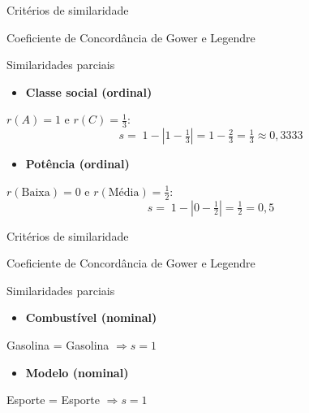 \documentclass[
  ignorenonframetext,
  aspectratio=169,
]{beamer}
\providecommand{\tightlist}{%
  \setlength{\itemsep}{0pt}\setlength{\parskip}{0pt}}
\begin{document}
\begin{frame}{Critérios de similaridade}
\label{crituxe9rios-de-similaridade-17}
\begin{block}{Coeficiente de Concordância de Gower e Legendre}
\label{coeficiente-de-concorduxe2ncia-de-gower-e-legendre-10}
\begin{block}{Similaridades parciais}
\label{similaridades-parciais-1}
\begin{itemize}
\tightlist
\item
  \textbf{Classe social (ordinal)}
\end{itemize}

\(r(A)=1\) e \(r(C)=\tfrac{1}{3}\): \[
s=\;1-\left|1-\tfrac{1}{3}\right|=1-\tfrac{2}{3}=\tfrac{1}{3}\approx 0,3333
\]

\begin{itemize}
\tightlist
\item
  \textbf{Potência (ordinal)}
\end{itemize}

\(r(\text{Baixa})=0\) e \(r(\text{Média})=\tfrac{1}{2}\): \[
s=\;1-\left|0-\tfrac{1}{2}\right|=\tfrac{1}{2}=0,5
\]
\end{block}
\end{block}
\end{frame}

\begin{frame}{Critérios de similaridade}
\label{crituxe9rios-de-similaridade-18}
\begin{block}{Coeficiente de Concordância de Gower e Legendre}
\label{coeficiente-de-concorduxe2ncia-de-gower-e-legendre-11}
\begin{block}{Similaridades parciais}
\label{similaridades-parciais-2}
\begin{itemize}
\tightlist
\item
  \textbf{Combustível (nominal)}
\end{itemize}

Gasolina = Gasolina \(\Rightarrow s=1\)

\begin{itemize}
\tightlist
\item
  \textbf{Modelo (nominal)}
\end{itemize}

Esporte = Esporte \(\Rightarrow s=1\)
\end{block}
\end{block}
\end{frame}
\end{document}

